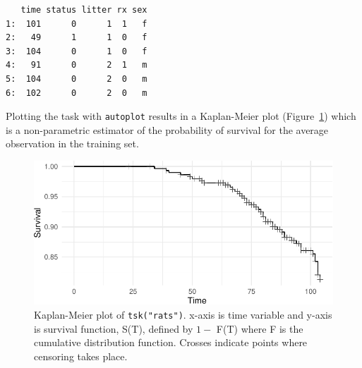 \begin{Shaded}
\begin{Highlighting}[]

\OtherTok{=} \SpecialCharTok{::} \NormalTok{,}
   \NormalTok{, } \NormalTok{, } \NormalTok{)}

\SpecialCharTok{$}\NormalTok{()}
\end{Highlighting}
\end{Shaded}

\begin{verbatim}
   time status litter rx sex
1:  101      0      1  1   f
2:   49      1      1  0   f
3:  104      0      1  0   f
4:   91      0      2  1   m
5:  104      0      2  0   m
6:  102      0      2  0   m
\end{verbatim}

Plotting the task with \texttt{autoplot} results in a
Kaplan-Meier plot (Figure~\ref{fig-autokm}) which is
a non-parametric estimator of the probability of survival for the
average observation in the training set.

\begin{Shaded}
\begin{Highlighting}[]
\end{Highlighting}
\end{Shaded}

\begin{figure}

{\centering \includegraphics[width=1\textwidth,height=\textheight]{chapters/chapter13/beyond_regression_and_classification_files/figure-pdf/fig-autokm-1.pdf}

}

\caption{\label{fig-autokm}Kaplan-Meier plot of \texttt{tsk("rats")}.
x-axis is time variable and y-axis is survival function, S(T), defined
by \(1 -\) F(T) where F is the cumulative distribution function. Crosses
indicate points where censoring takes place.}

\end{figure}


